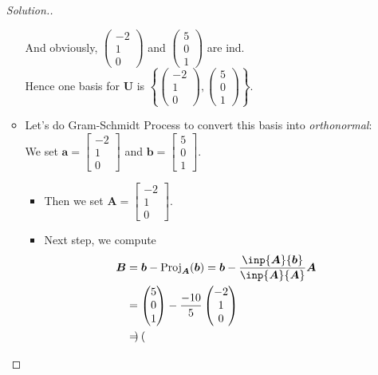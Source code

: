 \begin{enumerate}
\begin{proof}[Solution.]
\begin{itemize}
And obviously, $\begin{pmatrix}
-2\\1\\0
\end{pmatrix}$ and $\begin{pmatrix}
5\\0\\1
\end{pmatrix}$ are ind.\\
Hence one basis for $\bm U$ is $\left\{\begin{pmatrix}
-2\\1\\0
\end{pmatrix},\begin{pmatrix}
5\\0\\1
\end{pmatrix}\right\}.$
\item
Let's do Gram-Schmidt Process to convert this basis into \textit{orthonormal}:\\
We set $\bm a=\begin{bmatrix}
-2\\1\\0
\end{bmatrix}$ and $\bm b=\begin{bmatrix}
5\\0\\1
\end{bmatrix}$.
\begin{itemize}
\item
Then we set $\bm A=\begin{bmatrix}
-2\\1\\0
\end{bmatrix}$.
\item
Next step, we compute 
\begin{align*}
\bm B&=\bm b-\Proj_{\bm A}(\bm b)=\bm b-\frac{\inp{\bm A}{\bm b}}{\inp{\bm A}{\bm A}}\bm A\\
&=\begin{pmatrix}
5\\0\\1
\end{pmatrix}-\frac{-10}{5}\begin{pmatrix}
-2\\1\\0
\end{pmatrix}\\
&=\begin{pmatrix}

\end{pmatrix}
\end{align*}
\end{itemize}
\end{itemize}
\end{proof}
\end{enumerate}

